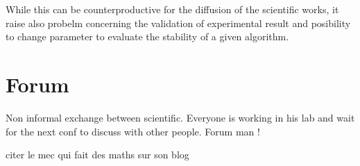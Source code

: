 While this can be counterproductive for the diffusion of the scientific works, it raise also probelm concerning the validation of experimental result and posibility to change parameter to evaluate the stability of a given algorithm.


\section{Forum} %
\label{sec:forum}
Non informal exchange between scientific.
Everyone is working in his lab and wait for the next conf to discuss with other people.
Forum man !

citer le mec qui fait des maths sur son blog
